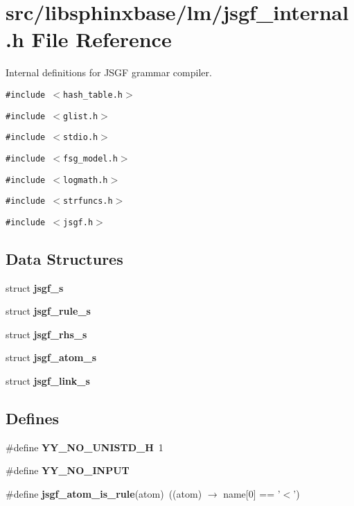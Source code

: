 \section{src/libsphinxbase/lm/jsgf\_\-internal.h File Reference}
\label{jsgf__internal_8h}
Internal definitions for JSGF grammar compiler.  


{\tt \#include $<$hash\_\-table.h$>$}\par
{\tt \#include $<$glist.h$>$}\par
{\tt \#include $<$stdio.h$>$}\par
{\tt \#include $<$fsg\_\-model.h$>$}\par
{\tt \#include $<$logmath.h$>$}\par
{\tt \#include $<$strfuncs.h$>$}\par
{\tt \#include $<$jsgf.h$>$}\par
\subsection*{Data Structures}
\begin{CompactItemize}
\item 
struct \textbf{jsgf\_\-s}
\item 
struct \textbf{jsgf\_\-rule\_\-s}
\item 
struct \textbf{jsgf\_\-rhs\_\-s}
\item 
struct \textbf{jsgf\_\-atom\_\-s}
\item 
struct \textbf{jsgf\_\-link\_\-s}
\end{CompactItemize}
\subsection*{Defines}
\begin{CompactItemize}
\item 
\#define \textbf{YY\_\-NO\_\-UNISTD\_\-H}~1\label{jsgf__internal_8h_e78ac56cd1f29572e967ed7636952d15}

\item 
\#define \textbf{YY\_\-NO\_\-INPUT}\label{jsgf__internal_8h_85523a0c7d95c059d251b4e9829947aa}

\item 
\#define \textbf{jsgf\_\-atom\_\-is\_\-rule}(atom)~((atom) $\rightarrow$ name[0] == '$<$')\label{jsgf__internal_8h_c4452bbb59863e64d73f4fe2d6cd394f}

\end{CompactItemize}
